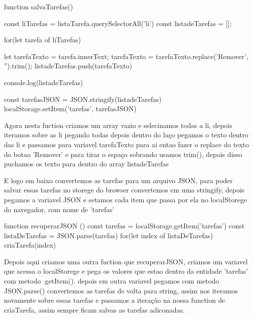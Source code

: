 function salvaTarefas(){
   const liTarefas = listaTarefa.querySelectorAll('li')
   const listadeTarefas = [];

   for(let tarefa of liTarefas){
     let tarefaTexto = tarefa.innerText;
     tarefaTexto = tarefaTexto.replace('Remover', '').trim();
     listadeTarefas.push(tarefaTexto)

     console.log(listadeTarefas)
   }

   const tarefasJSON = JSON.stringify(listadeTarefas)
   localStorage.setItem('tarefas', tarefasJSON)
}

Agora nesta fuction criamos um array vazio e selecinamos todas a li, depois iteramos sobre as li pegando todas
depois dentro do laço pegamos o texto dentro das li e passamos para variavel tarefaTexto para ai entao fazer o
replace do texto do botao 'Remover' e para tirar o espaço sobrando usamos trim(), depois disso puchamos os texto 
para dentro do array listadeTarefas 

E logo em baixo convertemos as tarefas para um arquivo JSON, para poder salvar essas tarefas no storege do browser
convertemos em uma stringify, depois pegamos a variavel JSON e setamos cada item que passa por ela no localStorege
do navegador, com nome de 'tarefas'

function recuperarJSON (){
    const tarefas = localStorage.getItem('tarefas')
    const listaDeTarefas = JSON.parse(tarefas)
    for(let index of listaDeTarefas){
        criaTarefa(index)
    }
}

Depois aqui criamos uma outra fuction que recuperarJSON, criamos um variavel que acessa o localStorege e pega 
os valores que estao dentro da entidade 'tarefas' com metodo .getItem(). depois em outra variavel pegamos com metodo
JSON.parse() convertemos as tarefas de volta para string, assim nos iteramos novamente sobre essas tarefas 
e passamos a iteração na nossa function de criaTarefa, assim sempre ficam salvas as tarefas adiconadas.





